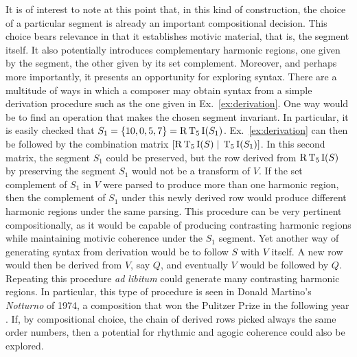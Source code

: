 It is of interest to note at this point that, in this kind of construction, the choice of a particular segment is already an important compositional decision. This choice bears relevance in that it establishes motivic material, that is, the segment itself. It also potentially introduces complementary harmonic regions, one given by the segment, the other given by its set complement. Moreover, and perhaps more importantly, it presents an opportunity for exploring syntax. There are a multitude of ways in which a composer may obtain syntax from a simple derivation procedure such as the one given in Ex.~\ref{ex:derivation}. One way would be to find an operation that makes the chosen segment invariant. In particular, it is easily checked that $S_1 = \{ 10, 0, 5, 7 \} = \operatorname{R}\operatorname{T}_5\operatorname{I}(S_1)$. Ex.~\ref{ex:derivation} can then be followed by the combination matrix $[\operatorname{R}\operatorname{T}_5\operatorname{I}(S) \; | \; \operatorname{T}_5\operatorname{I}(S_1)]$. In this second matrix, the segment $S_1$ could be preserved, but the row derived from $\operatorname{R}\operatorname{T}_5\operatorname{I}(S)$ by preserving the segment $S_1$ would not be a transform of $V$. If the set complement of $S_1$ in $V$ were parsed to produce more than one harmonic region, then the complement of $S_1$ under this newly derived row would produce different harmonic regions under the same parsing. This procedure can be very pertinent compositionally, as it would be capable of producing contrasting harmonic regions while maintaining motivic coherence under the $S_1$ segment. Yet another way of generating syntax from derivation would be to follow $S$ with $V$ itself. A new row would then be derived from $V$, say $Q$, and eventually $V$ would be followed by $Q$. Repeating this procedure \emph{ad libitum} could generate many contrasting harmonic regions. In particular, this type of procedure is seen in Donald Martino's \emph{Notturno} of 1974, a composition that won the Pulitzer Prize in the following year \cite[181]{Starr1984}. If, by compositional choice, the chain of derived rows picked always the same order numbers, then a potential for rhythmic and agogic coherence could also be explored.


%

